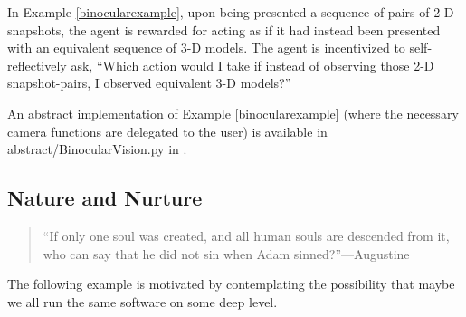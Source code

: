 \documentclass[runningheads]{llncs}
\begin{document}
In Example \ref{binocularexample}, upon being presented a sequence of pairs of 2-D snapshots,
the agent is rewarded for acting as if it had instead been presented with an equivalent
sequence of 3-D models.
The agent is incentivized to self-reflectively ask, ``Which action would I take if instead
of observing those 2-D snapshot-pairs, I observed equivalent 3-D models?''

An abstract implementation of Example \ref{binocularexample} (where the necessary camera
functions are delegated to the user) is available in abstract/BinocularVision.py
in \cite{library}.

\subsection{Nature and Nurture}

\begin{quote}
    ``If only one soul was created, and all human souls are descended from it,
    who can say that he did not sin when Adam sinned?''---Augustine \cite{augustine1993free}
\end{quote}

The following example is motivated by contemplating the possibility that maybe we all
run the same software on some deep level.
\end{document}

